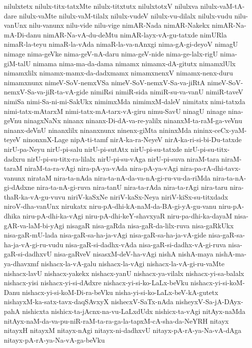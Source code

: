 {nilulxtetx
nilulx-titx-tatxMte
nilulx-titxtutx
nilulxtotxV
nilulxva
nilulx-vaM-tA-dare
nilulx-vaMte
nilulx-vaM-tilalx
nilulx-vudeV
nilulx-vu-dilalx
nilulx-vudu
nilu-vanUnx
nilu-vanunx
nilu-vide
nilu-vige
nimAR-Nada
nimAR-Nakekx
nimAR-Na-mA-Di-danu
nimAR-Na-vA-du-deMtu
nimAR-layx-vA-gu-tatxde
nimURla
nimaR-la-teyu
nimaR-la-vAda
nimaR-la-va-nAnxgi
nima-gA-gi-deyoV
nimagU
nimage
nima-geVke
nima-geV-nA-daru
nima-geV-nide
nima-ge-lalx-rigU
nima-giM-talU
nimama
nima-ma-da-dama
nimamx
nimamx-dA-gitutx
nimamxlUlx
nimamxlilx
nimamx-mamx-da-dadxmamx
nimamxnenxV
nimamx-nenx-duru
nimamxnunx
nimeV-SoV-nemxVSa
nimeV-SoV-nemxV-Sa-va-jiRtA
nimeV-SoV-nemxV-Sa-va-jiR-ta-vA-gide
nimiRsi
nimiR-sida
nimiR-su-va-vanU
nimiR-taveV
nimiSa
nimi-Sa-ni-mi-SakUkx
nimimxMda
nimimxM-daleV
nimitatx
nimi-tatxda
nimi-tatx-mAtarxM
nimi-tatx-mA-tarx-vA-giru
nimu-SavU
ninagU
ninage
nina-geVnu
ninagxNaNx
ninanx
ninanx-Di-dA-va-re-yalilx
ninanxM-ta-raM-ga-veVnu
ninanx-deVnU
ninanxlilx
ninanxnunx
ninenx-giMta
nininxMda
nininx-ceCx-yaM-teyeV
ninonxnX-Lage
nipA-ti-tamf
nirA-ka-ra-NeyeV
nirA-ka-ri-si-bi-Du-tatxde
nirU-pa-Neyu
nirU-pi-salu
nirU-pi-sutAtx
nirU-pi-su-tatxde
nirU-pi-su-titx-dadxru
nirU-pi-su-titx-ra-lilalx
nirU-pi-su-vAga
nirU-pi-suva
niraM-tara
niraM-taraM
niraM-ta-ra-vAgi
nira-pA-ya-vAda
nira-pA-ya-vAgi
nira-pa-rA-dhi-tavx-vanunx
nirataM
nira-ta-nAda
nira-ta-nA-da-va-nA-gi-ru-vu-da-riMda
nira-ta-nA-gi-dAdxne
nira-ta-nA-gi-ruva
nira-tanU
nira-ta-rAda
nira-ta-rAgi
nira-taru
nira-thaR-ka-vA-gu-vuvu
niriV-kaSxNe
niriV-kaSx-Neya
niriV-kiSx-su-titxdadx
niroV-dha-vanUnx
nirukatx
niru-pA-dhi-kA-naM-da-BA-gi-yA-gu-vanu
niru-pA-dhika
niru-pA-dhi-ka-vAgi
niru-pA-dhi-keY-shavxyaR
niru-pa-dhi-ka-dayaM
nisa-gAR-va-laM-bi-yAgi
nisagaR
nisa-gaRda
nisa-gaR-da-lilx-ruva
nisa-gaRkUkx
nisa-gaR-mU-lada
nisa-gaR-sa-ha-ja-vAgi
nisa-gaR-sa-ha-ja-vA-gide
nisa-gaR-sa-ha-ja-vA-gi-ru-vudu
nisa-gaR-si-dadhx-vAda
nisa-gaR-si-dadhx-vA-gi-ruva
nisa-gaR-si-dadhxvU
nisa-gaRveV
nisasxM-deV-ha-vAgi
nishA
nishA-maya
nishA-ma-ya-dhavxmf
nishacx-la-vA-galu
nishacx-la-vAgi
nishacx-la-vA-gi-ru-vaMte
nishacx-lavU
nishacx-yakekx
nishacx-yanU
nishacx-ya-vilalx
nishacx-yi-sa-balalx
nishacx-yisi
nishacx-yi-si-dAdxre
nishacx-yi-si-ko-LaLx-beVku
nishacx-yi-si-koM-Danu
nishacx-yi-si-koM-Di-ra-beVku
nisha-yi-si-ko-LaLx-beV-kA-gutetx
nishayxM-ka-satx-tavx-daqSAvxyX
nishecxV-SaTx-nAda
nisheyxV-Sa-jA-DAyx-pahA
nishicxta
nishicx-ta-jAcnx-na-vu-LaLxdUdx
nishicx-ta-vAgi
nitAyx-naMda
nitAyx-naM-da-va-pu-niR-raM-ta-ra-ga-la-tapxM-cA-sha-da-NeYRH
nitayx
nitayxH
nitayxM
nitayx-nAgi
nitayx-ni-dadhxvU
nitayx-pA-rA-ya-Na-vA-dAga
nitayx-pA-rA-ya-Na-vA-ga-beVku
}
